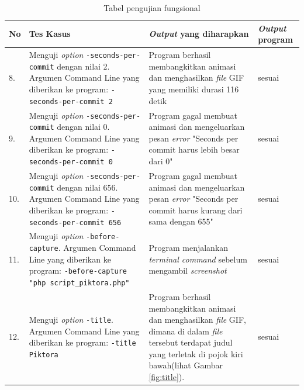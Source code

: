 \begin{table}[htbp]
\begin{tabular}{|p{0.3cm}|>{\raggedright} p{5.5 cm}| p{7 cm}| p{3 cm}|}
		
		
		
		\end{tabular}
	\label{table:hasil_pengujian1}
\end{table}


\begin{table}[htbp]
	\centering
	\caption{Tabel pengujian fungsional}
	
		\begin{tabular}{|p{0.3cm}|>{\raggedright} p{7 cm}| p{5.5 cm}| p{3 cm}|} \hline
		No & Tes Kasus	& \textit{Output} yang diharapkan & \textit{Output} program \\ \hline
		8. & Menguji \textit{option} \texttt{-seconds-per-commit} dengan nilai 2. Argumen Command Line yang diberikan ke program: \texttt{-seconds-per-commit 2} & Program berhasil membangkitkan animasi dan menghasilkan \textit{file} GIF yang memiliki durasi 116 detik & sesuai \\ \hline
		9. & Menguji \textit{option} \texttt{-seconds-per-commit} dengan nilai 0. Argumen Command Line yang diberikan ke program: \texttt{-seconds-per-commit 0} & Program gagal membuat animasi dan mengeluarkan pesan \textit{error} "Seconds per commit harus lebih besar dari 0" & sesuai \\ \hline
		10. & Menguji \textit{option} \texttt{-seconds-per-commit} dengan nilai 656. Argumen Command Line yang diberikan ke program: \texttt{-seconds-per-commit 656} & Program gagal membuat animasi dan mengeluarkan pesan \textit{error} "Seconds per commit harus kurang dari sama dengan 655" & sesuai \\ \hline
		11. & Menguji \textit{option} \texttt{-before-capture}. Argumen Command Line yang diberikan ke program: \texttt{-before-capture "php script\_piktora.php"} & Program menjalankan \textit{terminal command} sebelum mengambil \textit{screenshot} & sesuai  \\ \hline
		
		12. & Menguji \textit{option} \texttt{-title}. Argumen Command Line yang diberikan ke program: \texttt{-title Piktora}  & Program berhasil membangkitkan animasi dan menghasilkan \textit{file} GIF, dimana di dalam \textit{file} tersebut terdapat judul yang terletak di pojok kiri bawah(lihat Gambar \ref{fig:title}). & sesuai \\ \hline
					

\end{tabular}
\end{table}
